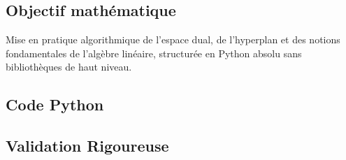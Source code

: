 \hypertarget{objectif-mathuxe9matique-1}{%
\subsection{Objectif mathématique}\label{objectif-mathuxe9matique-1}}

Mise en pratique algorithmique de l'espace dual, de l'hyperplan et des
notions fondamentales de l'algèbre linéaire, structurée en Python absolu
sans bibliothèques de haut niveau.

\hypertarget{code-python-1}{%
\subsection{Code Python}\label{code-python-1}}

\begin{Shaded}
\begin{Highlighting}[]
\OperatorTok{=} 
     \NormalTok{(}
\OperatorTok{+=}\OperatorTok{*}

\OperatorTok{=}\NormalTok{ hyperplane\_equation\_from\_normal([}\NormalTok{, }\OperatorTok{{-}}\NormalTok{, }\NormalTok{], [}\NormalTok{, }\NormalTok{, }\NormalTok{])}
\OperatorTok{==}\NormalTok{ [}\NormalTok{, }\OperatorTok{{-}}\NormalTok{, }\NormalTok{]}
\OperatorTok{==} 
\end{Highlighting}
\end{Shaded}

\hypertarget{validation-rigoureuse-1}{%
\subsection{Validation Rigoureuse}\label{validation-rigoureuse-1}}

